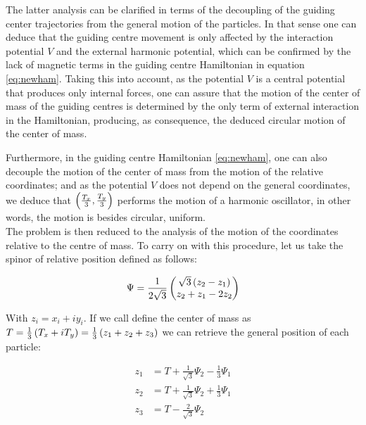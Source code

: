 The latter analysis can be clarified in terms of the decoupling of the guiding center trajectories from the general motion of the particles. In that sense one can deduce that the guiding centre movement is only affected by the interaction potential $V$ and the external harmonic potential, which can be confirmed by the lack of magnetic terms in the guiding centre Hamiltonian in equation \eqref{eq:newham}. Taking this into account, as the potential $V$ is a central potential that produces only internal forces, one can assure that the motion of the center of mass of the guiding centres is determined by the only term of external interaction in the Hamiltonian, producing, as consequence, the deduced circular motion of the center of mass.

Furthermore, in the guiding centre Hamiltonian \eqref{eq:newham}, one can also decouple the motion of the center of mass from the motion of the relative coordinates; and as the potential $V$ does not depend on the general coordinates, we deduce that $\left( \frac{T_x}{3},\frac{T_y}{3} \right)$ performs the motion of a harmonic oscillator, in other words, the motion is besides circular, uniform. \\

The problem is then reduced to the analysis of the motion of the coordinates relative to the centre of mass. To carry on with this procedure, let us take the spinor of relative position defined as follows:

\begin{align}
\Psi = \frac{1}{2\sqrt{3}}\begin{pmatrix}\sqrt{3}\left( z_{2}-z_{1} \right)\\
z_{2}+z_{1}-2z_{2}\end{pmatrix}
\end{align}

With $z_{i} = x_i + iy_i$. If we call define the center of mass as $T = \frac{1}{3}\left( T_x + iT_y \right) = \frac{1}{3}\left( z_1 +z_2+z_3 \right)$ we can retrieve the general position of each particle:

\small
\begin{equation}
\begin{aligned}
z_1 &= T+\frac{1}{\sqrt{3}}\Psi_2 - \frac{1}{3}\Psi_1 \\
z_2 &= T+\frac{1}{\sqrt{3}}\Psi_2 + \frac{1}{3}\Psi_1 \\
z_3 &= T-\frac{2}{\sqrt{3}}\Psi_2
\end{aligned}
\label{eq:singlevecs}
\end{equation}
\normalsize

